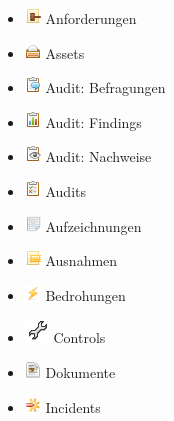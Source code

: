 \documentclass[a4paper,10pt]{book}
\begin{document}
\begin{itemize}
\item \includegraphics[height=2ex]{Icon/16-paper-gavel-alt.png} Anforderungen
\item \includegraphics[height=2ex]{Icon/Asset.png} Assets
\item \includegraphics[height=2ex]{Icon/Clipboard_comment.png} Audit: Befragungen
\item \includegraphics[height=2ex]{Icon/Clipboard_report.png} Audit: Findings
\item \includegraphics[height=2ex]{Icon/Clipboard_eye.png} Audit: Nachweise
\item \includegraphics[height=2ex]{Icon/Clipboard_audit.png} Audits
\item \includegraphics[height=2ex]{Icon/Text.png} Aufzeichnungen
\item \includegraphics[height=2ex]{Icon/16-paper-excerpt-yellow.png} Ausnahmen
\item \includegraphics[height=2ex]{Icon/Lightening.png} Bedrohungen
\item \includegraphics[height=2ex]{Icon/Controls.png} Controls
\item \includegraphics[height=2ex]{Icon/Document.png} Dokumente
\item \includegraphics[height=2ex]{Icon/Incident.png} Incidents

\end{itemize}
\end{document}
